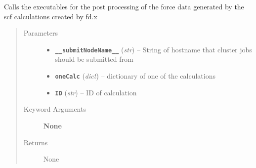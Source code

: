 \documentclass[letterpaper,10pt,english]{sphinxmanual}
\begin{document}
\begin{fulllineitems}
\label{run:run.__pp_phonon}
Calls the executables for the post processing of the force
data generated by the scf calculations created by fd.x
\begin{quote}\begin{description}
\item[{Parameters}] \leavevmode\begin{itemize}
\item {} 
\textbf{\texttt{\_\_submitNodeName\_\_}} (\emph{str}) -- String of hostname that cluster jobs should be submitted from

\item {} 
\textbf{\texttt{oneCalc}} (\emph{dict}) -- dictionary of one of the calculations

\item {} 
\textbf{\texttt{ID}} (\emph{str}) -- ID of calculation

\end{itemize}

\item[{Keyword Arguments}] \leavevmode
\textbf{None}

\item[{Returns}] \leavevmode
None

\end{description}\end{quote}

\end{fulllineitems}

\end{document}
